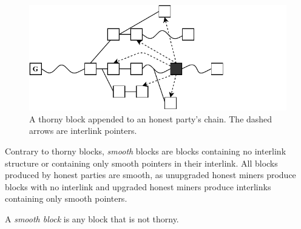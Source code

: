 \begin{figure}[h]
	\begin{center}
		\includegraphics[width=0.9\columnwidth]{figures/thorny_block.pdf}
	\end{center}
	\caption{A thorny block appended to an honest party's chain.
	The dashed arrows are interlink pointers.}
	\label{fig:thorny_block}
\end{figure}

Contrary to thorny blocks, \emph{smooth} blocks are blocks containing no interlink structure or containing only smooth pointers in their interlink. All blocks produced by honest parties are smooth, as unupgraded honest miners produce blocks with no interlink and upgraded honest miners produce interlinks containing only smooth pointers.

\begin{definition}
	A \emph{smooth block} is any block that is not thorny.
	\label{defn:smooth_block}
\end{definition}

